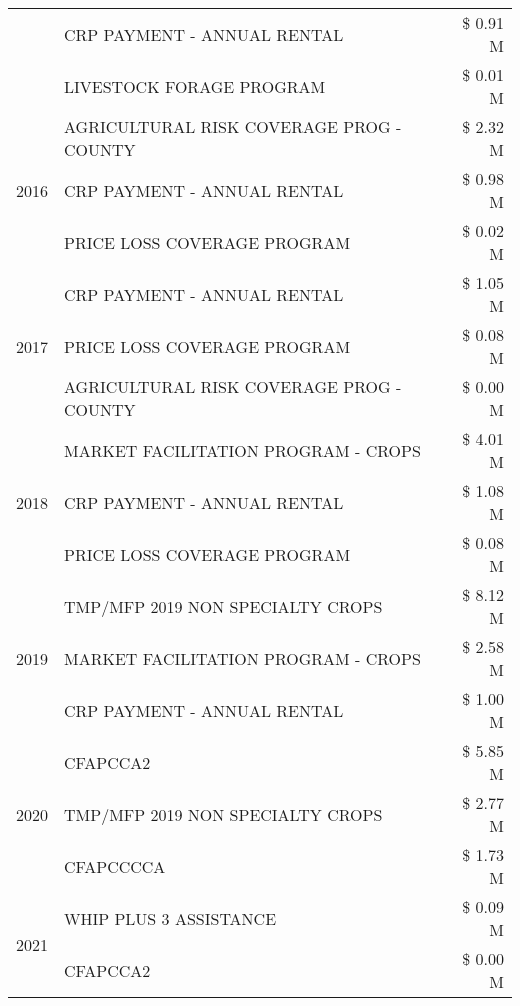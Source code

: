 \begin{tabular}{llr}
 & CRP PAYMENT - ANNUAL RENTAL & \$ 0.91 M \\
 & LIVESTOCK FORAGE PROGRAM & \$ 0.01 M \\
\cline{1-3}
\multirow[t]{3}{*}{2016} & AGRICULTURAL RISK COVERAGE PROG - COUNTY & \$ 2.32 M \\
 & CRP PAYMENT - ANNUAL RENTAL & \$ 0.98 M \\
 & PRICE LOSS COVERAGE PROGRAM & \$ 0.02 M \\
\cline{1-3}
\multirow[t]{3}{*}{2017} & CRP PAYMENT - ANNUAL RENTAL & \$ 1.05 M \\
 & PRICE LOSS COVERAGE PROGRAM & \$ 0.08 M \\
 & AGRICULTURAL RISK COVERAGE PROG - COUNTY & \$ 0.00 M \\
\cline{1-3}
\multirow[t]{3}{*}{2018} & MARKET FACILITATION PROGRAM - CROPS & \$ 4.01 M \\
 & CRP PAYMENT - ANNUAL RENTAL & \$ 1.08 M \\
 & PRICE LOSS COVERAGE PROGRAM & \$ 0.08 M \\
\cline{1-3}
\multirow[t]{3}{*}{2019} & TMP/MFP 2019 NON SPECIALTY CROPS & \$ 8.12 M \\
 & MARKET FACILITATION PROGRAM - CROPS & \$ 2.58 M \\
 & CRP PAYMENT - ANNUAL RENTAL & \$ 1.00 M \\
\cline{1-3}
\multirow[t]{3}{*}{2020} & CFAPCCA2 & \$ 5.85 M \\
 & TMP/MFP 2019 NON SPECIALTY CROPS & \$ 2.77 M \\
 & CFAPCCCCA & \$ 1.73 M \\
\cline{1-3}
\multirow[t]{2}{*}{2021} & WHIP PLUS 3 ASSISTANCE & \$ 0.09 M \\
 & CFAPCCA2 & \$ 0.00 M \\
\cline{1-3}
\bottomrule
\end{tabular}
